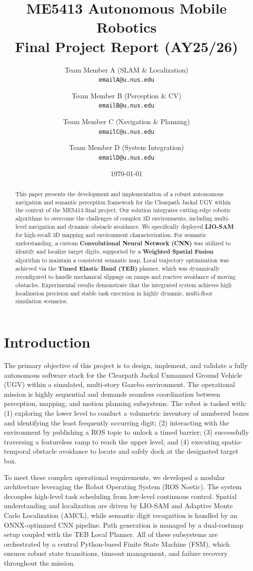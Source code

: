 \documentclass[11pt, a4paper]{article}
\title{\textbf{ME5413 Autonomous Mobile Robotics}\\Final Project Report (AY25/26)}
\author{
  Team Member A (SLAM \& Localization) \\ \texttt{emailA@u.nus.edu} \and
  Team Member B (Perception \& CV) \\ \texttt{emailB@u.nus.edu} \and
  Team Member C (Navigation \& Planning) \\ \texttt{emailC@u.nus.edu} \and
  Team Member D (System Integration) \\ \texttt{emailD@u.nus.edu}
}
\date{\today}
\begin{document}
\maketitle

\begin{abstract}
This paper presents the development and implementation of a robust autonomous navigation and semantic perception framework for the Clearpath Jackal UGV within the context of the ME5413 final project. Our solution integrates cutting-edge robotic algorithms to overcome the challenges of complex 3D environments, including multi-level navigation and dynamic obstacle avoidance. We specifically deployed \textbf{LIO-SAM} for high-recall 3D mapping and environment characterization. For semantic understanding, a custom \textbf{Convolutional Neural Network (CNN)} was utilized to identify and localize target digits, supported by a \textbf{Weighted Spatial Fusion} algorithm to maintain a consistent semantic map. Local trajectory optimization was achieved via the \textbf{Timed Elastic Band (TEB)} planner, which was dynamically reconfigured to handle mechanical slippage on ramps and reactive avoidance of moving obstacles. Experimental results demonstrate that the integrated system achieves high localization precision and stable task execution in highly dynamic, multi-floor simulation scenarios.
\end{abstract}

\section{Introduction}
The primary objective of this project is to design, implement, and validate a fully autonomous software stack for the Clearpath Jackal Unmanned Ground Vehicle (UGV) within a simulated, multi-story Gazebo environment. The operational mission is highly sequential and demands seamless coordination between perception, mapping, and motion planning subsystems. The robot is tasked with: (1) exploring the lower level to conduct a volumetric inventory of numbered boxes and identifying the least frequently occurring digit; (2) interacting with the environment by publishing a ROS topic to unlock a timed barrier; (3) successfully traversing a featureless ramp to reach the upper level; and (4) executing spatio-temporal obstacle avoidance to locate and safely dock at the designated target box.

To meet these complex operational requirements, we developed a modular architecture leveraging the Robot Operating System (ROS Noetic). The system decouples high-level task scheduling from low-level continuous control. Spatial understanding and localization are driven by LIO-SAM and Adaptive Monte Carlo Localization (AMCL), while semantic digit recognition is handled by an ONNX-optimized CNN pipeline. Path generation is managed by a dual-costmap setup coupled with the TEB Local Planner. All of these subsystems are orchestrated by a central Python-based Finite State Machine (FSM), which ensures robust state transitions, timeout management, and failure recovery throughout the mission.
\end{document}
